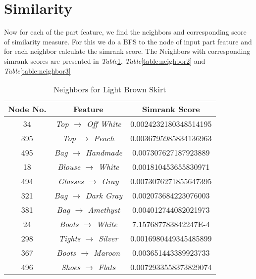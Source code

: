 \section{Similarity}
Now for each of the part feature, we find the neighbors and corresponding score of similarity measure. For this we do a BFS to the node of input part feature and for each neighbor calculate the simrank score. The Neighbors with corresponding simrank scores are presented in \textit{Table}\ref{table:neighbor1}, \textit{Table}\ref{table:neighbor2} and \textit{Table}\ref{table:neighbor3}
\begin{table}
\centering
\caption{Neighbors for Light Brown Skirt}
\begin{tabular}{|c|c|c|}
\hline
Node No. & Feature & Simrank Score\\
\hline\hline
34 & \textit{Top $\rightarrow$ Off White} & 0.0024232180348514195 \\
395 & \textit{Top $
\rightarrow$ Peach} & 0.0036795985834136963 \\
495 & \textit{Bag $
\rightarrow$ Handmade} & 0.007307627187923889 \\
18 & \textit{Blouse $\rightarrow$ White} & 0.001810453655830971 \\
494 & \textit{Glasses $\rightarrow$ Gray} & 0.0073076271855647395 \\
321 & \textit{Bag $\rightarrow$ Dark Gray} & 0.002073684223076003 \\
381 & \textit{Bag $
\rightarrow$ Amethyst} & 0.004012744082021973 \\
24 & \textit{Boots $
\rightarrow$ White} & 7.157687783842247E-4 \\
298 & \textit{Tights $
\rightarrow$ Silver} & 0.0016980449345485899 \\
367 & \textit{Boots $
\rightarrow$ Maroon} & 0.003651443389923733 \\
496 & \textit{Shoes $
\rightarrow$ Flats} & 0.0072933558373829074 \\
\hline\end{tabular}
\label{table:neighbor1}
\end{table}

